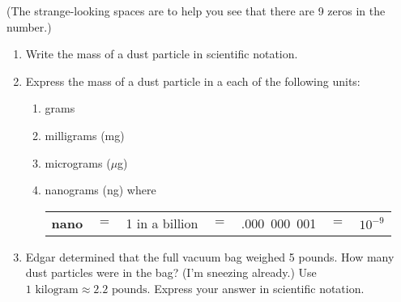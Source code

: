 \begin{enumerate}
(The strange-looking spaces are to help you see that there are 9 zeros in the number.)
\begin{enumerate}
\item Write the mass of a dust particle in scientific notation. \vfill
\item Express the mass of a dust particle in a each of the following units: \bigskip\begin{enumerate}
\item  grams \vfill 
\item milligrams (mg) \vfill
\item micrograms ($\mu$g) \vfill
\item nanograms (ng) where
\begin{center}
\begin{tabular} {lclcrcc} 
\textbf{nano} &$=$&1 in a billion &$=$&.000~000~001 &$=$&$10^{-9}$\\
\end{tabular}
\end{center} \vfill

\end{enumerate}
\item Edgar determined that the full vacuum bag weighed 5 pounds. How many dust particles were in the bag?  (I'm sneezing already.) Use $1 \text{ kilogram} \approx 2.2 \text{ pounds}$. Express your answer in scientific notation.   \vfill \vfill
\end{enumerate} 

\newpage %


\end{enumerate}
